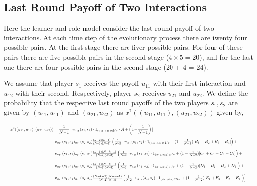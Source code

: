 \documentclass[11pt]{article}
\theoremstyle{plainCl1}
\theoremstyle{plainCl2}
\begin{document}
\subsection{Last Round Payoff of Two Interactions}

Here the learner and role model consider the last round payoff of two
interactions. At each time step of the evolutionary process there are twenty
four possible pairs. At the first stage there are fiver possible pairs. For four of
these pairs there are five possible pairs in the second stage (\(4 \times 5 =
20\)), and for the last one there are four possible pairs in the second stage
(20 + 4 = 24). 

We assume that player \(s_1\) receives the payoff
\(u_{11}\) with their first interaction and \(u_{12}\) with their second.
Respectively, player \(s_2\) receives \(u_{21}\) and \(u_{22}\). We define the
probability that the respective last round payoffs of the two players \(s_1,
s_2\) are given by \((u_{11}, u_{11})\) and \((u_{21}, u_{22})\) as
\(x^{2}((u_{11}, u_{11}), (u_{21}, u_{22}))\) given by,

\begin{equation}
  \resizebox{.99\textwidth}{!}
  {%
$
  \setlength{\arraycolsep}{1pt}
  \begin{array}{llrl}
  x^{2}((u_{11}, u_{12}), (u_{21}, u_{22}))	& = \displaystyle \frac{1}{N\!-\!1}\cdot v_{u_{11}}(s_1,s_2)\cdot 1_{(u_{11},u_{21})\in \mathcal{U}_F} \cdot A + \left(1\!-\!\frac{1}{N\!-\!1}\right) \left[ \right. \\[0.5cm] 
  & \left. v_{u_{11}}(s_1,s_2) _{u_{21}}(s_2,s_2)  \frac{\left(k - 2\right) \left(k - 1\right)}{(N\!-\!2)(N\!-\!3)}
  \left(\frac{1}{N\!-\!2}\cdot v_{u_{11}}(s_1,s_2)\cdot 1_{(u_{11},u_{21})\in \mathcal{U}_F} + (1 - \frac{1}{N - 2}) [B_1 + B_2 + B_3 + B_4]\right) + \right. \\[0.5cm] 
  & \left. v_{u_{11}}(s_1,s_2) _{u_{21}}(s_2,s_1)  \frac{\left(k - 1\right) \left(N - k - 1\right)}{(N\!-\!2)(N\!-\!3)} \left(\frac{1}{N\!-\!2}\cdot v_{u_{11}}(s_1,s_2)\cdot 1_{(u_{11},u_{21})\in \mathcal{U}_F} + (1 - \frac{1}{N - 2}) [C_1 + C_2 + C_3 + C_4]\right) + \right. \\[0.5cm] 
  & \left. v_{u_{11}}(s_1,s_1) _{u_{21}}(s_2,s_2)  \frac{\left(k - 1\right) \left(N - k - 1\right)}{(N\!-\!2)(N\!-\!3)} \left(\frac{1}{N\!-\!2}\cdot v_{u_{11}}(s_1,s_2)\cdot 1_{(u_{11},u_{21})\in \mathcal{U}_F} + (1 - \frac{1}{N - 2}) [D_1 + D_2 + D_3 + D_4]\right) + \right. \\[0.5cm] 
  & \left. v_{u_{11}}(s_1,s_1) _{u_{21}}(s_2,s_1)  \frac{\left(N - k - 2\right) \left(N - k - 1\right)}{(N\!-\!2)(N\!-\!3)} \left(\frac{1}{N\!-\!2}\cdot v_{u_{11}}(s_1,s_2)\cdot 1_{(u_{11},u_{21})\in \mathcal{U}_F} + (1 - \frac{1}{N - 2}) [E_1 + E_2 + E_3 + E_4]\right) \right]
  \end{array} $}
\end{equation}
\end{document}

